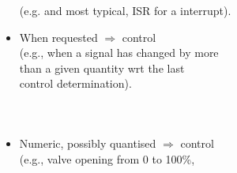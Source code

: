 \begin{frame}
\begin{columns}
\begin{itemize}[<+-| alert@+>]
         (e.g. and most typical, ISR for a  interrupt).
   \item \vspace{6mm}When requested $\Rightarrow$  control\\
         (e.g., when a signal has changed 
          by more\\ than a given quantity wrt the last\\ control determination).
   \end{itemize}
 \end{columns}
\end{frame}

\begin{frame}\mccz
{}
\myPause
 \begin{columns}
   \begin{itemize}[<+-| alert@+>]
   \item Numeric, possibly quantised $\Rightarrow$  control\\
         (e.g., valve opening from 0 to 100\%,\\

\end{itemize}
\end{columns}
\end{frame}
